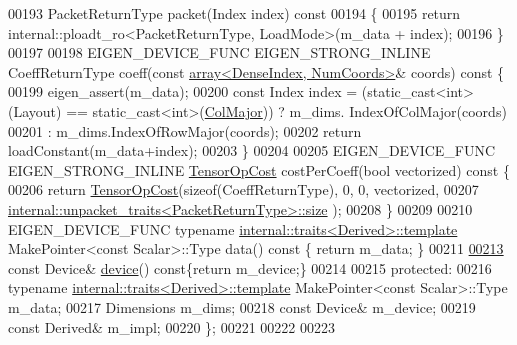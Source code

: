 \begin{DoxyCode}
00193   PacketReturnType packet(Index index)\textcolor{keyword}{ const}
00194 \textcolor{keyword}{  }\{
00195     \textcolor{keywordflow}{return} internal::ploadt\_ro<PacketReturnType, LoadMode>(m\_data + index);
00196   \}
00197 
00198   EIGEN\_DEVICE\_FUNC EIGEN\_STRONG\_INLINE CoeffReturnType coeff(\textcolor{keyword}{const} 
      \hyperlink{class_eigen_1_1array}{array<DenseIndex, NumCoords>}& coords)\textcolor{keyword}{ const }\{
00199     eigen\_assert(m\_data);
00200     \textcolor{keyword}{const} Index index = (\textcolor{keyword}{static\_cast<}\textcolor{keywordtype}{int}\textcolor{keyword}{>}(Layout) == static\_cast<int>(\hyperlink{group__enums_ggaacded1a18ae58b0f554751f6cdf9eb13a0cbd4bdd0abcfc0224c5fcb5e4f6669a}{ColMajor})) ? m\_dims.
      IndexOfColMajor(coords)
00201                         : m\_dims.IndexOfRowMajor(coords);
00202     \textcolor{keywordflow}{return} loadConstant(m\_data+index);
00203   \}
00204 
00205   EIGEN\_DEVICE\_FUNC EIGEN\_STRONG\_INLINE \hyperlink{class_eigen_1_1_tensor_op_cost}{TensorOpCost} costPerCoeff(\textcolor{keywordtype}{bool} vectorized)\textcolor{keyword}{ const }\{
00206     \textcolor{keywordflow}{return} \hyperlink{class_eigen_1_1_tensor_op_cost}{TensorOpCost}(\textcolor{keyword}{sizeof}(CoeffReturnType), 0, 0, vectorized,
00207                         \hyperlink{struct_eigen_1_1internal_1_1unpacket__traits}{internal::unpacket\_traits<PacketReturnType>::size}
      );
00208   \}
00209 
00210   EIGEN\_DEVICE\_FUNC \textcolor{keyword}{typename} \hyperlink{struct_eigen_1_1internal_1_1traits}{internal::traits<Derived>::template} 
      MakePointer<const Scalar>::Type data()\textcolor{keyword}{ const }\{ \textcolor{keywordflow}{return} m\_data; \}
00211 
\hyperlink{struct_eigen_1_1_tensor_evaluator_3_01const_01_derived_00_01_device_01_4_ac5b59eb35ea904aca2c6e6fa6e719ff4}{00213}   \textcolor{keyword}{const} Device& \hyperlink{struct_eigen_1_1_tensor_evaluator_3_01const_01_derived_00_01_device_01_4_ac5b59eb35ea904aca2c6e6fa6e719ff4}{device}()\textcolor{keyword}{ const}\{\textcolor{keywordflow}{return} m\_device;\}
00214 
00215  \textcolor{keyword}{protected}:
00216   \textcolor{keyword}{typename} \hyperlink{struct_eigen_1_1internal_1_1traits}{internal::traits<Derived>::template} MakePointer<const
       Scalar>::Type m\_data;
00217   Dimensions m\_dims;
00218   \textcolor{keyword}{const} Device& m\_device;
00219   \textcolor{keyword}{const} Derived& m\_impl;
00220 \};
00221 
00222 
00223 

\end{DoxyCode}
